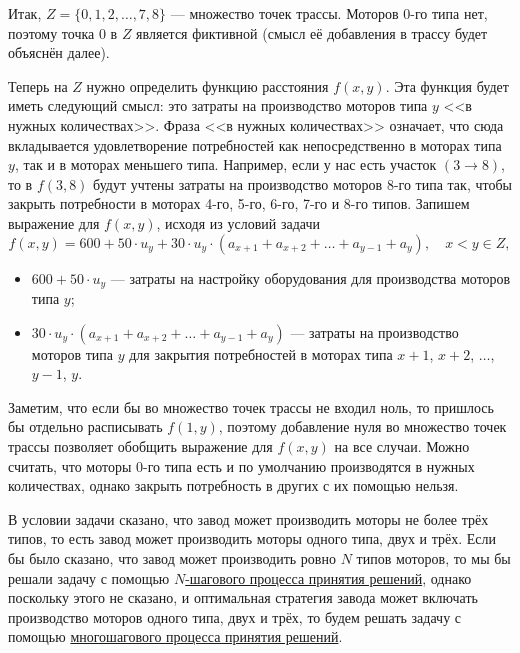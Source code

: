 Итак, $\boxed{Z = \{0, 1, 2, \dots, 7, 8\}}$ --- множество точек трассы. Моторов 0-го типа нет, поэтому точка 0 в $Z$ является фиктивной (смысл её добавления в трассу будет объяснён далее).

Теперь на $Z$ нужно определить функцию расстояния $f(x, y)$. Эта функция будет иметь следующий смысл: это затраты на производство моторов типа $y$ <<в нужных количествах>>. Фраза <<в нужных количествах>> означает, что сюда вкладывается удовлетворение потребностей как непосредственно в моторах типа $y$, так и в моторах меньшего типа. Например, если у нас есть участок $(3 \to 8)$, то в $f(3, 8)$ будут учтены затраты на производство моторов 8-го типа так, чтобы закрыть потребности в моторах 4-го, 5-го, 6-го, 7-го и 8-го типов. Запишем выражение для $f(x, y)$, исходя из условий задачи
\[
\boxed{f(x, y) = 600 + 50 \cdot u_y + 30 \cdot u_y \cdot (a_{x+1} + a_{x+2} + \dots + a_{y-1} + a_y)}, \quad x < y \in Z,
\]

\begin{itemize}[nosep]
	\item $600 + 50 \cdot u_y$ --- затраты на настройку оборудования для производства моторов типа $y$;
	
	\item $30 \cdot u_y \cdot (a_{x+1} + a_{x+2} + \dots + a_{y-1} + a_y)$ --- затраты на производство моторов типа $y$ для закрытия потребностей в моторах типа $x+1$, $x+2$, $\dots$, $y-1$, $y$.
\end{itemize}

Заметим, что если бы во множество точек трассы не входил ноль, то пришлось бы отдельно расписывать $f(1, y)$, поэтому добавление нуля во множество точек трассы позволяет обобщить выражение для $f(x, y)$ на все случаи. Можно считать, что моторы 0-го типа есть и по умолчанию производятся в нужных количествах, однако закрыть потребность в других с их помощью нельзя.

В условии задачи сказано, что завод может производить моторы не более трёх типов, то есть завод может производить моторы одного типа, двух и трёх. Если бы было сказано, что завод может производить ровно $N$ типов моторов, то мы бы решали задачу с помощью \hyperref[alg:n_step_process]{$N$-шагового процесса принятия решений}, однако поскольку этого не сказано, и оптимальная стратегия завода может включать производство моторов одного типа, двух и трёх, то будем решать задачу с помощью \hyperref[alg:unknown_step_process]{многошагового процесса принятия решений}.

\solution

